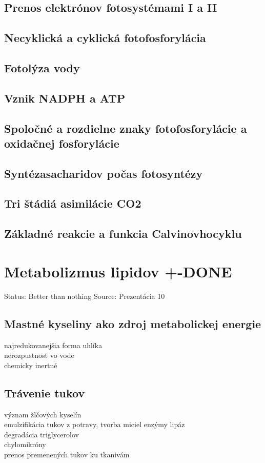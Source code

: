 \subsection{Prenos elektrónov fotosystémami I a II}
\subsection{Necyklická a cyklická fotofosforylácia}
\subsection{Fotolýza vody}
\subsection{Vznik NADPH a ATP}
\subsection{Spoločné a rozdielne znaky fotofosforylácie a oxidačnej fosforylácie}
\subsection{Syntézasacharidov počas fotosyntézy}
\subsection{Tri štádiá asimilácie CO2}
\subsection{Základné reakcie a funkcia Calvinovhocyklu}
\section{Metabolizmus lipidov +-DONE}

Status: Better than nothing
Source: Prezentácia 10

\subsection{Mastné kyseliny ako zdroj metabolickej energie}
najredukovanejšia forma uhlíka\\
nerozpustnosť vo vode\\
chemicky inertné\\
\subsection{Trávenie tukov}
význam žlčových kyselín\\
\tab emulzifikácia tukov z potravy, tvorba miciel
enzýmy lipáz\\
\tab degradácia triglycerolov\\
chylomikróny\\
\tab prenos premenených tukov ku tkanivám\\
